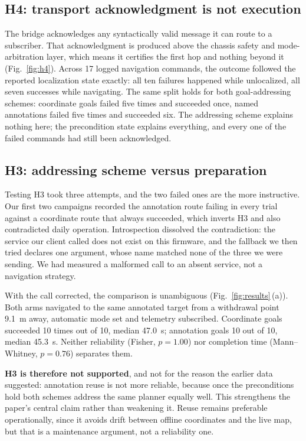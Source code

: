 \subsection{H4: transport acknowledgment is not execution}



The bridge acknowledges any syntactically valid message it can route to a subscriber. That
acknowledgment is produced above the chassis safety and mode-arbitration layer, which means it
certifies the first hop and nothing beyond it (Fig.~\ref{fig:h4}). Across \num{17} logged
navigation commands, the outcome followed the reported localization state exactly: all ten
failures happened while unlocalized, all seven successes while navigating. The same split holds
for both goal-addressing schemes: coordinate goals failed five times and succeeded once, named
annotations failed five times and succeeded six. The addressing scheme explains nothing here;
the precondition state explains everything, and every one of the failed commands had still been
acknowledged.

\subsection{H3: addressing scheme versus preparation}

Testing H3 took three attempts, and the two failed ones are the more instructive. Our first two
campaigns recorded the annotation route failing in every trial against a coordinate route that
always succeeded, which inverts H3 and also contradicted daily operation. Introspection dissolved
the contradiction: the service our client called does not exist on this firmware, and the
fallback we then tried declares one argument, whose name matched none of the three we were
sending. We had measured a malformed call to an absent service, not a navigation strategy.

With the call corrected, the comparison is unambiguous (Fig.~\ref{fig:results}\,(a)). Both arms
navigated to the same annotated target from a withdrawal point \SI{9.1}{\meter} away, automatic
mode set and telemetry subscribed. Coordinate goals succeeded 10 times out of 10, median
\SI{47.0}{\second}; annotation goals 10 out of 10, median \SI{45.3}{\second}. Neither reliability
(Fisher, $p=1.00$) nor completion time (Mann--Whitney, $p=0.76$) separates them.

\textbf{H3 is therefore not supported}, and not for the reason the earlier data suggested:
annotation reuse is not more reliable, because once the preconditions hold both schemes address
the same planner equally well. This strengthens the paper's central claim rather than weakening
it. Reuse remains preferable operationally, since it avoids drift between offline coordinates and
the live map, but that is a maintenance argument, not a reliability one.

